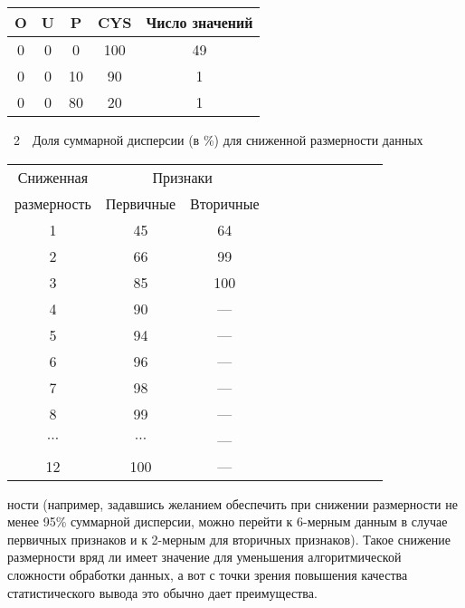 \begin{multicols}{2}
\begin{center}
\vspace*{2ex}

 
{\small \begin{tabular}{|c|c|c|c|c|}
\hline
O&U&P&CYS&Число значений\\
\hline
0&0&\hphantom{9}0&100\hphantom{9}&49\\
0&0&10&90&\hphantom{9}1\\
0&0&80&20&\hphantom{9}1\\
\hline
\end{tabular}}
\end{center}


\begin{center}  %
\parbox{64mm}{{{\tablename~2}\ \ \small{Доля суммарной дисперсии (в \%) для сниженной размерности данных}}}

\vspace*{2ex}

 
{\small 
\begin{tabular}{|c|c|c|c|c|c|c|c|c|c|c|}
\hline
Сниженная &\multicolumn{2}{c|}{Признаки}\\
\cline{2-3}
размерность & Первичные &Вторичные\\
\hline
1&45&64\\
2&66&99\\
3&85&100\hphantom{9}\\
4&90&---\\
5&94&---\\
6&96&---\\
7&98&---\\
8&99&---\\
$\cdots$&$\cdots$ &---\\
12\hphantom{9}&100\hphantom{9}&---\\
\hline
\end{tabular}}
\end{center}

\vspace*{6pt}


\addtocounter{table}{2}

\noindent
ности (например, задавшись желанием 
обеспечить при снижении размерности не менее 95\% суммарной дисперсии, можно перейти 
к 6-мер\-ным данным в случае первичных признаков и к 2-мер\-ным для вторичных 
признаков). Такое снижение размерности вряд ли имеет значение для уменьшения 
алгоритмической сложности обработки данных, а вот с точки зрения повышения качества 
статистического вывода это обычно дает преимущества.
    


\end{multicols}
